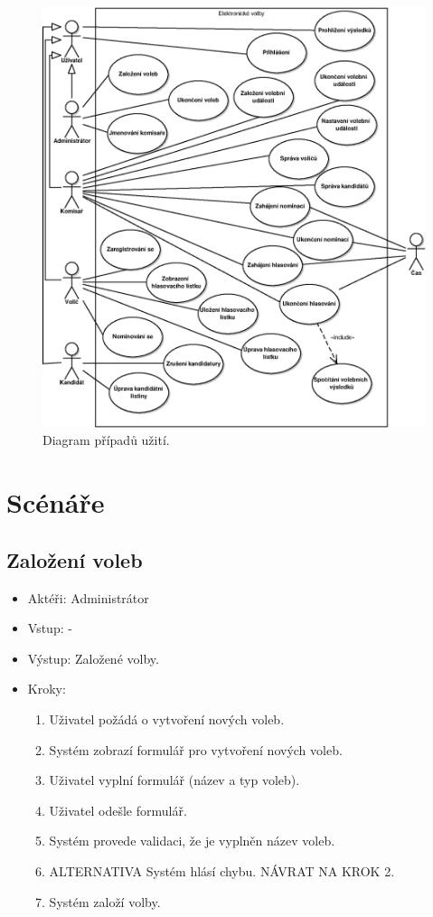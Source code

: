 \documentclass[11pt,twoside,a4paper]{book}
\begin{document}
\begin{figure}[h!]
	\centering
	\includegraphics[scale=0.9]{diagrams/pripady_uziti.eps}
	\caption{Diagram případů užití.}
	\label{fig:pripady_uziti}
\end{figure}

\section{Scénáře}

\subsection{Založení voleb}

\begin{itemize}
\item Aktéři: Administrátor
\item Vstup: -
\item Výstup: Založené volby.
\item Kroky:
	\begin{enumerate}
		\item Uživatel požádá o vytvoření nových voleb.
		\item Systém zobrazí formulář pro vytvoření nových voleb.
		\item Uživatel vyplní formulář (název a typ voleb).
		\item Uživatel odešle formulář.
		\item Systém provede validaci, že je vyplněn název voleb.
		\item ALTERNATIVA Systém hlásí chybu. NÁVRAT NA KROK 2.
		\item Systém založí volby.
	\end{enumerate}
\end{itemize}
\end{document}
